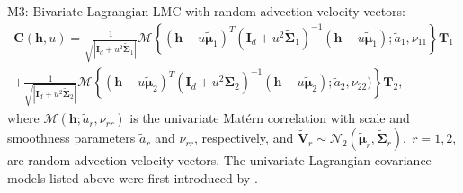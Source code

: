 \documentclass[12pt]{article}
\newcommand{\0}{\mathbf{0}}
\begin{document}
\begin{compactitem}
\item M3: Bivariate Lagrangian LMC with random advection velocity vectors: 
\begin{multline*}
\mathbf{C}(\mathbf{h}, u)=\frac{1}{\sqrt{|\mathbf{I}_d+u^2\tilde{\boldsymbol{\Sigma}}_1|}}\mathcal{M}\left\{\left(\mathbf{h}-u\tilde{\boldsymbol{\mu}}_1\right)^T\left(\mathbf{I}_d+u^2\tilde{\boldsymbol{\Sigma}}_1\right)^{-1}\left(\mathbf{h}-u\tilde{\boldsymbol{\mu}}_1\right);\tilde{a}_1,\nu_{11}\right\} \mathbf{T}_1  \\
+\frac{1}{\sqrt{|\mathbf{I}_d+u^2\tilde{\boldsymbol{\Sigma}}_2|}}\mathcal{M}\left\{\left(\mathbf{h}-u\tilde{\boldsymbol{\mu}}_2\right)^T\left(\mathbf{I}_d+u^2\tilde{\boldsymbol{\Sigma}}_2\right)^{-1}\left(\mathbf{h}-u\tilde{\boldsymbol{\mu}}_2\right);\tilde{a}_2,\nu_{22})\right\} \mathbf{T}_2,
\end{multline*}
where $\mathcal{M}(\mathbf{h};\tilde{a}_r,\nu_{rr})$ is the univariate Mat\'e{r}n correlation with scale and smoothness parameters $\tilde{a}_r$ and $\nu_{rr}$, respectively, and $\tilde{\mathbf{V}}_{r}\sim\mathcal{N}_2(\tilde{\boldsymbol{\mu}}_r,\tilde{\boldsymbol{\Sigma}}_r),\;r=1,2$, are random advection velocity vectors. The univariate Lagrangian covariance models listed above were first introduced by \citet{schlather2010some}.


\end{compactitem}
\end{document}
